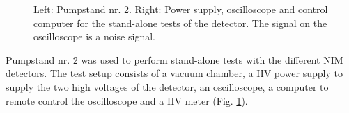 \begin{figure}[h]
\begin{subfigure}{.5\textwidth}
			\end{subfigure}
			\caption{Left: Pumpstand nr. 2. Right: Power supply, oscilloscope and control computer for the stand-alone tests of the detector. The signal on the oscilloscope is a noise signal.}
			\label{fig:Pumpstand2}
		\end{figure}
		Pumpstand nr. 2 was used to perform stand-alone tests with the different NIM detectors. The test setup consists of a vacuum chamber, a HV power supply to supply the two high voltages of the detector, an oscilloscope, a computer to remote control the oscilloscope and a HV meter (Fig. \ref{fig:Pumpstand2}).\\
		

